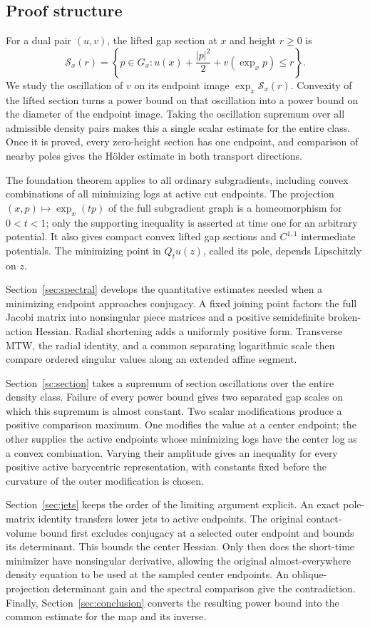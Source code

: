 \subsection{Proof structure}

For a dual pair $(u,v)$, the lifted gap section at $x$ and
height $r\geq0$ is
\[
 \mathcal S_x(r)=\left\{p\in G_x:
       u(x)+\frac{|p|^2}{2}+v(\exp_xp)\leq r\right\}.
\]
We study the oscillation of $v$ on its endpoint image
$\exp_x\mathcal S_x(r)$. Convexity of the lifted section
turns a power bound on that oscillation into a power bound
on the diameter of the endpoint image. Taking the oscillation
supremum over all admissible density pairs makes this a single
scalar estimate for the entire class. Once it is proved, every
zero-height section has one endpoint, and comparison of nearby
poles gives the H\"older estimate in both transport directions.

The foundation theorem applies to all ordinary subgradients, including
convex combinations of all minimizing logs at active cut endpoints.
The projection $(x,p)\mapsto\exp_x(tp)$ of the full subgradient graph
is a homeomorphism for $0<t<1$; only the supporting inequality is
asserted at time one for an arbitrary potential. It also gives compact
convex lifted gap sections and $C^{1,1}$ intermediate potentials.
The minimizing point in $Q_tu(z)$, called its pole, depends
Lipschitzly on $z$.

Section~\ref{sec:spectral} develops the quantitative estimates needed
when a minimizing endpoint approaches conjugacy. A fixed joining
point factors the full Jacobi matrix into nonsingular piece
matrices and a positive semidefinite broken-action Hessian.
Radial shortening adds a uniformly positive form. Transverse MTW,
the radial identity, and a common separating logarithmic scale
then compare ordered singular values along an extended affine
segment.

Section~\ref{sc:section} takes a supremum of section oscillations
over the entire density class. Failure of every power bound gives
two separated gap scales on which this supremum is almost constant.
Two scalar modifications produce a positive comparison maximum.
One modifies the value at a center endpoint; the other supplies
the active endpoints whose minimizing logs have the center log
as a convex combination.
Varying their amplitude gives an inequality for every positive
active barycentric representation, with constants fixed before
the curvature of the outer modification is chosen.

Section~\ref{sec:jets} keeps the order of the limiting argument
explicit. An exact pole-matrix identity transfers lower jets to
active endpoints. The original contact-volume bound first excludes
conjugacy at a selected outer endpoint and bounds its determinant.
This bounds the center Hessian. Only then does the short-time
minimizer have nonsingular derivative, allowing the original
almost-everywhere density equation to be used at the sampled
center endpoints. An oblique-projection determinant gain and the
spectral comparison give the contradiction. Finally,
Section~\ref{sec:conclusion} converts the resulting power bound
into the common estimate for the map and its inverse.
